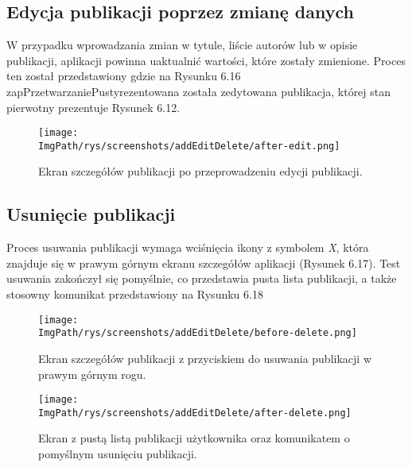 \documentclass[a4paper,12pt,twoside,openany]{report}
\newcommand{\ImgPath}{.}
\begin{document}
\subsection{Edycja publikacji poprzez zmianę danych}
W przypadku wprowadzania zmian w tytule, liście autorów lub w opisie publikacji, aplikacji powinna uaktualnić wartości, które zostały zmienione. Proces ten został przedstawiony gdzie na Rysunku 6.16 zapPrzetwarzaniePustyrezentowana została zedytowana publikacja, której stan pierwotny prezentuje Rysunek 6.12.

\begin{figure}[!htbp]
	\begin{center}
		\centering
		\texttt{[image: \\ImgPath/rys/screenshots/addEditDelete/after-edit.png]}
	\end{center}
	\caption{Ekran szczegółów publikacji po przeprowadzeniu edycji publikacji.}
	\label{zrzutPoEdycji}
\end{figure}



\subsection{Usunięcie publikacji}
Proces usuwania publikacji wymaga wciśnięcia ikony z symbolem \textit{X}, która znajduje się w prawym górnym ekranu szczegółów aplikacji (Rysunek 6.17). Test usuwania zakończył się pomyślnie, co przedstawia pusta lista publikacji, a także stosowny komunikat przedstawiony na Rysunku 6.18

\begin{figure}[!htbp]
	\begin{center}
		\centering
		\texttt{[image: \\ImgPath/rys/screenshots/addEditDelete/before-delete.png]}
	\end{center}
	\caption{Ekran szczegółów publikacji z przyciskiem do usuwania publikacji w prawym górnym rogu.}
	\label{zrzutUsuwaniePrzycisk}
\end{figure}

\begin{figure}[!htbp]
	\begin{center}
		\centering
		\texttt{[image: \\ImgPath/rys/screenshots/addEditDelete/after-delete.png]}
	\end{center}
	\caption{Ekran z pustą listą publikacji użytkownika oraz komunikatem o pomyślnym usunięciu publikacji.}
	\label{zrzutUsuwanieLista}
\end{figure}
\end{document}
